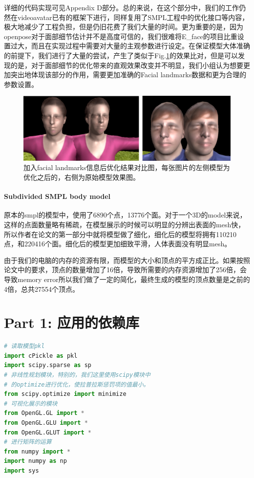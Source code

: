 \documentclass{article}
\begin{document}
详细的代码实现可见Appendix D部分。总的来说，在这个部分中，我们的工作仍然在videoavatar已有的框架下进行，同样复用了SMPL工程中的优化接口等内容，极大地减少了工程负担，但是仍旧花费了我们大量的时间。更为重要的是，因为openpose对于面部细节估计并不是高度可信的，我们很难将E\_face的项目比重设置过大，而且在实现过程中需要对大量的主观参数进行设定。在保证模型大体准确的前提下，我们进行了大量的尝试，产生了类似于Fig.\ref{face_compare}的效果比对，但是可以发现的是，对于面部细节的优化带来的直观效果改变并不明显，我们小组认为想要更加突出地体现该部分的作用，需要更加准确的Facial landmarks数据和更为合理的参数设置。


\begin{figure}
	\centering
	\includegraphics[width=16cm]{figure/faceoptimization.png}
	\caption{加入facial landmarks信息后优化结果对比图，每张图片的左侧模型为优化之后的，右侧为原始模型效果图。}
	\label{face_compare}
\end{figure}

\subsubsection{Subdivided SMPL body model}

原本的smpl的模型中，使用了6890个点，13776个面。对于一个3D的model来说，这样的点面数量略有稀疏，在模型展示的时候可以明显的分辨出表面的mesh快，所以作者在论文的第一部分中就将模型做了细化，细化后的模型将拥有110210 点，和220416个面。细化后的模型更加细致平滑，人体表面没有明显mesh。

由于我们的电脑的内存的资源有限，而模型的大小和顶点的平方成正比。如果按照论文中的要求，顶点的数量增加了16倍，导致所需要的内存资源增加了256倍，会导致memory error所以我们做了一定的简化，最终生成的模型的顶点数量是之前的4倍，总共27554个顶点。

\chapter{Part 1: 应用的依赖库}

\begin{lstlisting}[language=python]
# 读取模型pkl
import cPickle as pkl
import scipy.sparse as sp
# 非线性规划模块，特别的，我们这里使用scipy模块中
# 的optimize进行优化，使拉普拉斯惩罚项的值最小。
from scipy.optimize import minimize
# 可视化展示的模块
from OpenGL.GL import *
from OpenGL.GLU import *
from OpenGL.GLUT import *
# 进行矩阵的运算
from numpy import *
import numpy as np
import sys	
\end{lstlisting}
\end{document}
